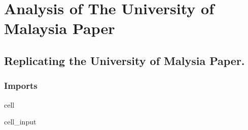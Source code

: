 \documentclass[letterpaper,10pt,english]{jupyterBook}
\begin{document}
\sphinxstepscope


\part{Analysis of The University of Malaysia Paper}

\sphinxstepscope


\chapter{Replicating the University of Malysia Paper.}
\label{\detokenize{notebooks/replicating_paper:replicating-the-university-of-malysia-paper}}\label{\detokenize{notebooks/replicating_paper::doc}}

\section{Imports}
\label{\detokenize{notebooks/replicating_paper:imports}}
\begin{sphinxuseclass}{cell}\begin{sphinxVerbatimInput}

\begin{sphinxuseclass}{cell_input}
\begin{sphinxVerbatim}[commandchars=\\\{\}]
   
   
   
   
\end{sphinxVerbatim}

\end{sphinxuseclass}\end{sphinxVerbatimInput}

\end{sphinxuseclass}
\end{document}
